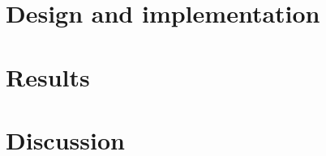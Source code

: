 \documentclass{epr400}
\begin{document}
\renewcommand{\eprthepartname}{Design and implementation}
\setcounter{section}{2}
\section{Design and implementation}

\clearpage
\renewcommand{\eprthepartname}{Results}
\section{Results}

\clearpage
\renewcommand{\eprthepartname}{Discussion}
\section{Discussion}

\clearpage
\renewcommand{\eprthepartname}{References}


\clearpage\appendix
\renewcommand{\eprthepartname}{Supporting evidence}

\clearpage

\clearpage

\end{document}
